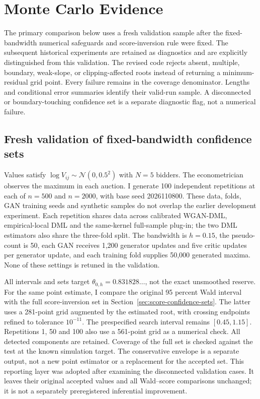 \section{Monte Carlo Evidence}

The primary comparison below uses a fresh validation sample after the
fixed-bandwidth numerical safeguards and score-inversion rule were fixed.
The subsequent historical experiments are retained as diagnostics and
are explicitly distinguished from this validation. The revised code rejects
absent, multiple, boundary, weak-slope, or clipping-affected roots instead of
returning a minimum-residual grid point. Every failure remains in the coverage
denominator. Lengths and conditional error summaries identify their valid-run
sample. A disconnected or boundary-touching confidence set is a separate
diagnostic flag, not a numerical failure.

\subsection{Fresh validation of fixed-bandwidth confidence sets}
\label{sec:fresh-validation}

Values satisfy $\log V_{ij}\sim\mathcal N(0,0.5^2)$ with $N=5$ bidders.
The econometrician observes the maximum in each auction. I generate 100
independent repetitions at each of $n=500$ and $n=2000$, with base seed
2026110800. These data, folds, GAN training seeds and synthetic samples do not
overlap the earlier development experiment. Each repetition shares data
across calibrated WGAN-DML, empirical-local DML and the same-kernel
full-sample plug-in; the two DML estimators also share the three-fold split.
The bandwidth is $h=0.15$, the pseudo-count is 50, each GAN receives 1,200
generator updates and five critic updates per generator update, and each
training fold supplies 50,000 generated maxima. None of these settings is
retuned in the validation.

All intervals and sets target $\theta_{0,h}=0.831828\ldots$, not the exact
unsmoothed reserve. For the same point estimate, I compare the original
95 percent Wald interval with the full score-inversion set in
Section~\ref{sec:score-confidence-sets}. The latter uses a 281-point grid
augmented by the estimated root, with crossing endpoints refined to
tolerance $10^{-11}$. The prespecified search interval remains
$[0.45,1.15]$. Repetitions 1, 50 and 100 also use a 561-point grid as a
numerical check. All detected components are retained. Coverage of the
full set is checked against the test at the known simulation target.
The conservative envelope is a separate output, not a new point estimator
or a replacement for the accepted set. This reporting layer was adopted
after examining the disconnected validation cases. It leaves their original
accepted values and all Wald--score comparisons unchanged; it is not a
separately preregistered inferential improvement.

